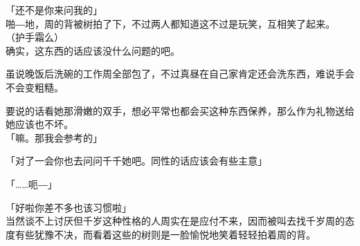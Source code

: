 「还不是你来问我的」\\

啪―地，周的背被树拍了下，不过两人都知道这不过是玩笑，互相笑了起来。\\

（护手霜么）\\

确实，这东西的话应该没什么问题的吧。

虽说晚饭后洗碗的工作周全部包了，不过真昼在自己家肯定还会洗东西，难说手会不会变粗糙。

要说的话看她那滑嫩的双手，想必平常也都会买这种东西保养，那么作为礼物送给她应该也不坏。\\

「嘛。那我会参考的」

「对了一会你也去问问千千她吧。同性的话应该会有些主意」

「……呃―」

「好啦你差不多也该习惯啦」\\

当然谈不上讨厌但千岁这种性格的人周实在是应付不来，因而被叫去找千岁周的态度有些犹豫不决，而看着这些的树则是一脸愉悦地笑着轻轻拍着周的背。
